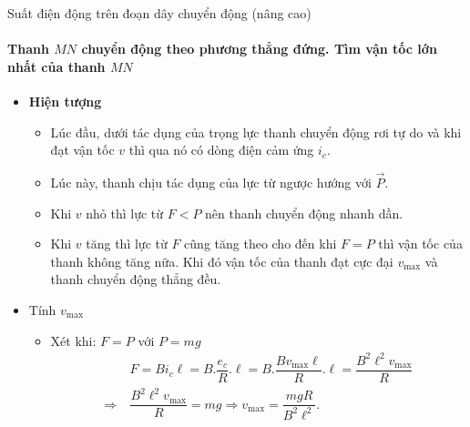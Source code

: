 \begin{dang}{Suất điện động trên đoạn dây chuyển động (nâng cao)}
{{\paragraph{Thanh $MN$ chuyển động theo phương thẳng đứng. Tìm vận tốc lớn nhất của thanh $MN$}
\begin{itemize}
\item \textbf{Hiện tượng}
\begin{itemize}
\item Lúc đầu, dưới tác dụng của trọng lực thanh chuyển động rơi tự do và khi đạt vận tốc $v$ thì qua nó có dòng điện cảm ứng $i_c$.
\item Lúc này, thanh chịu tác dụng của lực từ ngược hướng với $\vec{P}$.
\item Khi $v$ nhỏ thì lực từ $F<P$ nên thanh chuyển động nhanh dần.
\item Khi $v$ tăng thì lực từ $F$ cũng tăng theo cho đến khi $F=P$ thì vận tốc của thanh không tăng nữa. Khi đó vận tốc của thanh đạt cực đại $v_{\max}$ và thanh chuyển động thẳng đều.
\end{itemize}
\item Tính $v_{\max}$
\begin{itemize}
\item Xét khi: $F=P$ với $P=mg$ 
\begin{align*}
&F=Bi_c\ell=B.\dfrac{e_c}{R}.\ell=B.\dfrac{Bv_{\max}\ell}{R}.\ell=\dfrac{B^2\ell^2v_{\max}}{R}\\
\Rightarrow\ &\dfrac{B^2\ell^2v_{\max}}{R}= mg\Rightarrow  v_{\max}=\dfrac{mgR}{B^2\ell^2}.					
\end{align*}
\end{itemize}	
\end{itemize}
}
{
}}
\end{dang}